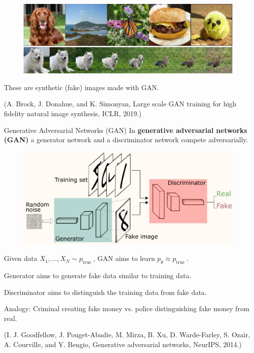 \begin{frame}[allowframebreaks]

\begin{figure}[H]
    \centering
    \includegraphics[width=1.0\textwidth]{.././assets/12.1.png}
\end{figure}

These are synthetic (fake) images made with GAN.

(A. Brock, J. Donahue, and K. Simonyan, Large scale GAN training for high fidelity natural image synthesis, ICLR, 2019.)

\end{frame}

\begin{frame}[allowframebreaks]

\begin{mydefinitionblock}{12.7}{Generative Adversarial Networks (GAN)}
    In \textbf{generative adversarial networks (GAN)} a generator network and a discriminator network compete adversarially.

    \begin{figure}[H]
        \centering
        \includegraphics[width=1.0\textwidth]{.././assets/12.2.jpg}
    \end{figure}

    Given data $X_{1}, \ldots, X_{N} \sim p_{\text {true }}$, GAN aims to learn $p_{\theta} \approx p_{\text {true }}$.

    Generator aims to generate fake data similar to training data.

    Discriminator aims to distinguish the training data from fake data.

    Analogy: Criminal creating fake money vs. police distinguishing fake money from real.

    (I. J. Goodfellow, J. Pouget-Abadie, M. Mirza, B. Xu, D. Warde-Farley, S. Ozair, A. Courville, and Y. Bengio, Generative adversarial networks, NeurIPS, 2014.)
\end{mydefinitionblock}

\end{frame}

